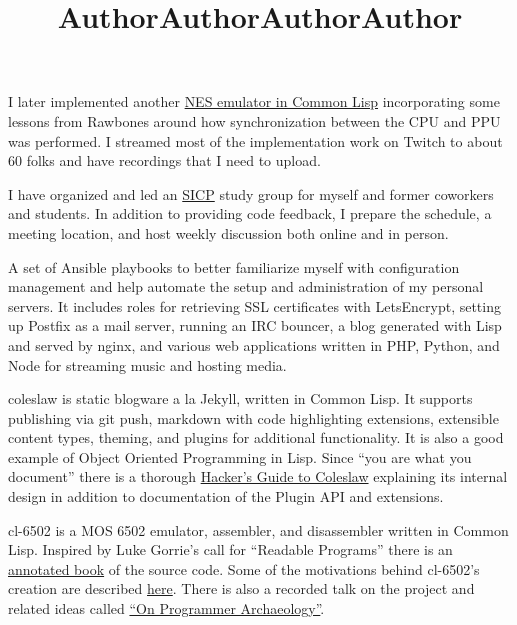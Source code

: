 \documentclass[margintitle,line]{res}
\begin{document}
\begin{resume}
\begin{position}
  I later implemented another \href{https://github.com/kingcons/clones}{NES emulator in Common Lisp} incorporating some
  lessons from Rawbones around how synchronization between the CPU and PPU was
  performed. I streamed most of the implementation work on Twitch to about 60
  folks and have recordings that I need to upload.
\end{position}

\title{Author}
\begin{position}
  I have organized and led an \href{https://sarabander.github.io/sicp/}{SICP} study group for
  myself and former coworkers and students. In addition to providing code feedback,
  I prepare the schedule, a meeting location, and host weekly discussion both online and in person.
\end{position}

\title{Author}
\begin{position}
  A set of Ansible playbooks to better familiarize myself with configuration management
  and help automate the setup and administration of my personal servers. It includes roles
  for retrieving SSL certificates with LetsEncrypt, setting up Postfix as a mail server,
  running an IRC bouncer, a blog generated with Lisp and served by nginx, and various
  web applications written in PHP, Python, and Node for streaming music and hosting media.
\end{position}

\title{Author}
\begin{position}
  coleslaw is static blogware a la Jekyll, written in Common Lisp. It
  supports publishing via git push, markdown with code highlighting extensions,
  extensible content types, theming, and plugins for additional functionality.
  It is also a good example of Object Oriented Programming in Lisp. Since ``you are what you document'' there is a thorough  \href{https://github.com/kingcons/coleslaw/blob/master/docs/hacking.md}{Hacker's Guide to Coleslaw}
  explaining its internal design in addition to documentation of the Plugin API
  and extensions.
\end{position}

\title{Author}
\begin{position}
  cl-6502 is a MOS 6502 emulator, assembler, and disassembler written in
  Common Lisp. Inspired by Luke Gorrie's call for ``Readable Programs'' there
  is an \href{http://redlinernotes.com/docs/cl-6502.pdf}{annotated book} of the
  source code.  Some of the motivations behind cl-6502's creation are described
  \href{https://blog.kingcons.io/posts/Towards-Comprehensible-Computing.html}{here}.
  There is also a recorded talk on the project and related ideas called
  \href{https://vimeo.com/redline6561/on-programmer-archaeology}{``On Programmer Archaeology''}.
\end{position}


\end{resume}
\end{document}

